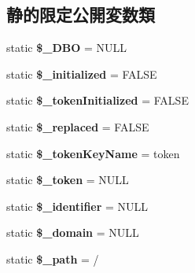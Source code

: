 \subsection*{静的限定公開変数類}
\begin{DoxyCompactItemize}
\item 
\hypertarget{class_session_d_b_a77bb91a3e040db8421600f00d5c52b67}{}static {\bfseries \$\+\_\+\+D\+B\+O} = N\+U\+L\+L\label{class_session_d_b_a77bb91a3e040db8421600f00d5c52b67}

\item 
\hypertarget{class_session_d_b_a0e2ea2fef693d8ce80b9ffaf28865cf3}{}static {\bfseries \$\+\_\+initialized} = F\+A\+L\+S\+E\label{class_session_d_b_a0e2ea2fef693d8ce80b9ffaf28865cf3}

\item 
\hypertarget{class_session_d_b_ae2bf7a0043c7473125f676f8165bb2f1}{}static {\bfseries \$\+\_\+token\+Initialized} = F\+A\+L\+S\+E\label{class_session_d_b_ae2bf7a0043c7473125f676f8165bb2f1}

\item 
\hypertarget{class_session_d_b_a4a86fda0a7eae21f83ee0cd13bd74208}{}static {\bfseries \$\+\_\+replaced} = F\+A\+L\+S\+E\label{class_session_d_b_a4a86fda0a7eae21f83ee0cd13bd74208}

\item 
\hypertarget{class_session_d_b_afd4032dbb1bdd29753245344750b4576}{}static {\bfseries \$\+\_\+token\+Key\+Name} = \textquotesingle{}token\textquotesingle{}\label{class_session_d_b_afd4032dbb1bdd29753245344750b4576}

\item 
\hypertarget{class_session_d_b_a199d1a99b891b74e9fc7913182d9aa2b}{}static {\bfseries \$\+\_\+token} = N\+U\+L\+L\label{class_session_d_b_a199d1a99b891b74e9fc7913182d9aa2b}

\item 
\hypertarget{class_session_d_b_a919d2613a316a1bae7e843803d9eecf4}{}static {\bfseries \$\+\_\+identifier} = N\+U\+L\+L\label{class_session_d_b_a919d2613a316a1bae7e843803d9eecf4}

\item 
\hypertarget{class_session_d_b_a62dad33fe1ce06c86c1c69e9d90bd40b}{}static {\bfseries \$\+\_\+domain} = N\+U\+L\+L\label{class_session_d_b_a62dad33fe1ce06c86c1c69e9d90bd40b}

\item 
\hypertarget{class_session_d_b_a0e1d5c789bd61b7b4ef031e6b7b08ab6}{}static {\bfseries \$\+\_\+path} = \textquotesingle{}/\textquotesingle{}\label{class_session_d_b_a0e1d5c789bd61b7b4ef031e6b7b08ab6}


\end{DoxyCompactItemize}
